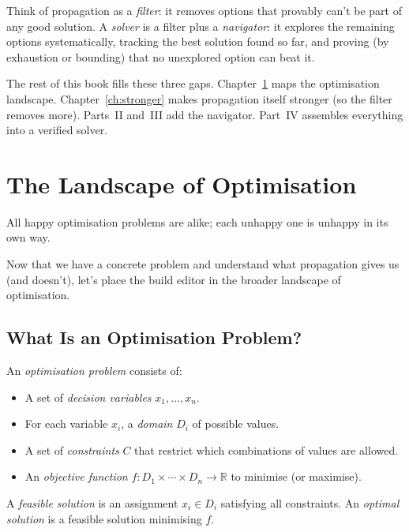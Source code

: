 \documentclass[11pt, a4paper, oneside]{book}
\newcommand{\R}{\mathbb{R}}
\begin{document}
\begin{intuitionbox}
Think of propagation as a \emph{filter}: it removes options that provably
can't be part of any good solution.  A \emph{solver} is a filter plus a
\emph{navigator}: it explores the remaining options systematically, tracking
the best solution found so far, and proving (by exhaustion or bounding) that
no unexplored option can beat it.
\end{intuitionbox}

The rest of this book fills these three gaps.  Chapter~\ref{ch:landscape} maps
the optimisation landscape.  Chapter~\ref{ch:stronger} makes propagation
itself stronger (so the filter removes more).  Parts~II and~III add the
navigator.  Part~IV assembles everything into a verified solver.

\chapter{The Landscape of Optimisation}
\label{ch:landscape}

\epigraph{All happy optimisation problems are alike;
each unhappy one is unhappy in its own way.}{}

Now that we have a concrete problem and understand what propagation gives us
(and doesn't), let's place the build editor in the broader landscape of
optimisation.

\section{What Is an Optimisation Problem?}

\begin{defbox}[title={Optimisation Problem}]
An \emph{optimisation problem} consists of:
\begin{itemize}[nosep]
  \item A set of \emph{decision variables} $x_1, \ldots, x_n$.
  \item For each variable $x_i$, a \emph{domain} $D_i$ of possible values.
  \item A set of \emph{constraints} $C$ that restrict which combinations
    of values are allowed.
  \item An \emph{objective function} $f : D_1 \times \cdots \times D_n \to \R$
    to minimise (or maximise).
\end{itemize}
A \emph{feasible solution} is an assignment $x_i \in D_i$ satisfying all
constraints.  An \emph{optimal solution} is a feasible solution minimising $f$.
\end{defbox}
\end{document}
